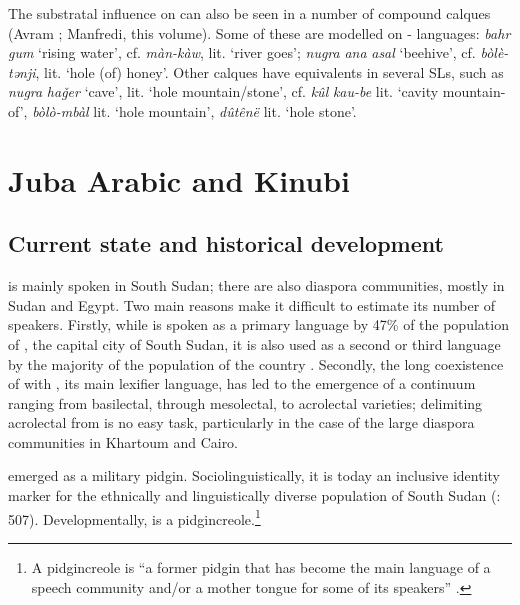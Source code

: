 \documentclass[output=paper]{langsci/langscibook}
\begin{document}
  The substratal influence on  can also be seen in a number of compound calques (Avram \citeyear{Avram2019}; Manfredi, this volume). Some of these are modelled on - languages: \textit{bahr} \textit{gum} ‘rising water’, cf.  \textit{màn-kà}\textit{w}, lit. ‘river goes’; \textit{nugra} \textit{ana} \textit{asal} ‘beehive’, cf.  \textit{bòlè-tǝnji}, lit. ‘hole (of) honey’. Other calques have equivalents in several SLs, such as \textit{nugra} \textit{haǧer} ‘cave’, lit. ‘hole mountain/stone’, cf.  \textit{kûl} \textit{kau-be} lit. ‘cavity mountain-of’,  \textit{bòlò-mbàl} lit. ‘hole mountain’,  \textit{dûtênë} lit. ‘hole stone’.


 \section{Juba Arabic and Kinubi}\label{sec:jub}


 \subsection{Current state and historical development}


  is mainly spoken in South Sudan; there are also {diaspora} communities, mostly in Sudan and Egypt. Two main reasons make it difficult to estimate its number of speakers. Firstly, while   is spoken as a primary language by 47\% of the population of , the capital city of South Sudan, it is also used as a second or third language by the majority of the population of the country \citep[7]{Manfredi2017}. Secondly, the long coexistence of   with  , its main {lexifier} language, has led to the emergence of a continuum ranging from basilectal, through mesolectal, to acrolectal varieties; delimiting acrolectal   from  is no easy task, particularly in the case of the large {diaspora} communities in Khartoum and Cairo.

    emerged as a military {pidgin}. Sociolinguistically, it is today an inclusive {identity} marker for the ethnically and linguistically diverse population of South Sudan (\citealt{ToscoManfredi2013}: 507). Developmentally,   is a pidgincreole.\footnote{A pidgincreole is “a former {pidgin} that has become the main language of a {speech community} and/or a mother tongue for some of its speakers” \citep[131]{Bakker2008}.}
\end{document}
